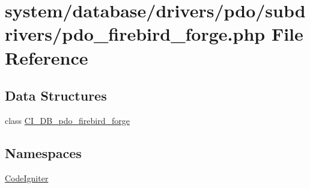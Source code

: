 \hypertarget{pdo__firebird__forge_8php}{}\section{system/database/drivers/pdo/subdrivers/pdo\+\_\+firebird\+\_\+forge.php File Reference}
\label{pdo__firebird__forge_8php}
\subsection*{Data Structures}
\begin{DoxyCompactItemize}
\item 
class \mbox{\hyperlink{class_c_i___d_b__pdo__firebird__forge}{C\+I\+\_\+\+D\+B\+\_\+pdo\+\_\+firebird\+\_\+forge}}
\end{DoxyCompactItemize}
\subsection*{Namespaces}
\begin{DoxyCompactItemize}
\item 
 \mbox{\hyperlink{namespace_code_igniter}{Code\+Igniter}}
\end{DoxyCompactItemize}
